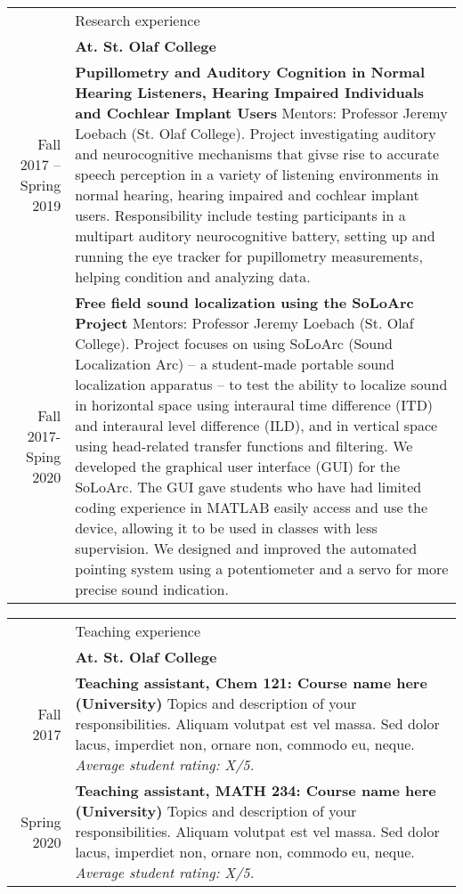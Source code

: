 \documentclass[letterpaper, 11pt]{article}
\newcommand{\headingfont}{\Large\color{Red}}
\newenvironment{SectionTable}[1]{
	\renewcommand*{\arraystretch}{1.7}
	\setlength{\tabcolsep}{10pt}
	\begin{longtable}{Rp{5.2in}} & #1 \\}
	{\end{longtable}\vspace{-.3cm}}
\begin{document}
	\begin{SectionTable}{\headingfont Research experience}
		& \textbf{At. St. Olaf College} \\
		Fall 2017 -- Spring 2019  &
		\textbf{Pupillometry and Auditory Cognition in Normal Hearing Listeners, Hearing Impaired Individuals and Cochlear Implant Users} \newline
		Mentors: Professor Jeremy Loebach (St. Olaf College). \newline
		Project investigating auditory and neurocognitive mechanisms that givse rise to accurate speech perception in a variety of listening environments in normal hearing, hearing impaired and cochlear implant users. Responsibility include testing participants in a multipart auditory neurocognitive battery, setting up and running the eye tracker for pupillometry measurements, helping condition and analyzing data. \\
		
		Fall 2017-Sping 2020 &
		\textbf{Free field sound localization using the SoLoArc Project} \newline
		Mentors:  Professor Jeremy Loebach (St. Olaf College). \newline
		Project focuses on using SoLoArc (Sound Localization Arc) – a student-made portable sound localization apparatus – to test the ability to localize sound in horizontal space using interaural time difference (ITD) and interaural level difference (ILD), and in vertical space using head-related transfer functions and filtering. We developed the graphical user interface (GUI) for the SoLoArc. The GUI gave students who have had limited coding experience in MATLAB easily access and use the device, allowing it to be used in classes with less supervision. We designed and improved the automated pointing system using a potentiometer and a servo for more precise sound indication.
		\\
	\end{SectionTable}
	
	
	\begin{SectionTable}{\headingfont Teaching experience}
		& \textbf{At. St. Olaf College} \\
		Fall 2017 & 
		\textbf{Teaching assistant, Chem 121: Course name here (University)} \newline
		Topics and description of your responsibilities. Aliquam volutpat est vel massa. Sed dolor lacus, imperdiet non, ornare non, commodo eu, neque. \newline
		\textit{Average student rating: X/5.} \\
		
		Spring 2020 & 
		\textbf{Teaching assistant, MATH 234: Course name here (University)} \newline
		Topics and description of your responsibilities. Aliquam volutpat est vel massa. Sed dolor lacus, imperdiet non, ornare non, commodo eu, neque. \newline
		\textit{Average student rating: X/5.}
	\end{SectionTable}
	
\end{document}
